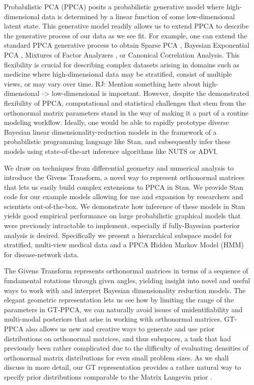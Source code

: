 \documentclass{article}
\newcommand{\commentRJ}[1]{{\textcolor{commentRJ_color}{RJ: #1}}}
\begin{document}
Probabilistic PCA (PPCA) \citep{tipping1999probabilistic} posits a probabilistic generative model where high-dimensional data is determined by a linear function of some low-dimensional latent state. This generative model readily allows us to extend PPCA to describe the generative process of our data as we see fit. For example, one can extend the standard PPCA generative process to obtain Sparse PCA \citep{hoff2009simulation}, Bayesian Exponential PCA \citep{mohamed2009bayesian}, Mixtures of Factor Analyzers \citep{ghahramani1996algorithm}, or Canonical Correlation Analysis. This flexibility is crucial for describing complex datasets arising in domains such as medicine where high-dimensional data may be stratified, consist of multiple views, or may vary over time. \commentRJ{Mention something here about high-dimensional -> low-dimensional is important.} However, despite the demonstrated flexibility of PPCA, computational and statistical challenges that stem from the orthonormal matrix parameters stand in the way of making it a part of a routine modeling workflow. Ideally, one would be able to rapidly prototype diverse Bayesian linear dimensionality-reduction models in the framework of a probabilistic programming language like Stan, and subsequently infer these models using state-of-the-art inference algorithms like NUTS or ADVI. 

We draw on techniques from differential geometry and numerical analysis to introduce the Givens Transform, a novel way to represent orthonormal matrices that lets us easily build complex extensions to PPCA in Stan. We provide Stan code for our example models allowing for use and expansion by researchers and scientists out-of-the-box. We demonstrate how inference of these models in Stan yields good empirical performance on large probabilistic graphical models that were previously intractable to implement, especially if fully-Bayesian posterior analysis is desired. Specifically we present a hierarchical subspace model for stratified, multi-view medical data and a PPCA Hidden Markov Model (HMM) for disease-network data.

The Givens Transform represents orthonormal matrices in terms of a sequence of fundamental rotations through given angles, yielding insight into novel and useful ways to work with and interpret Bayesian dimensionality reduction models.  The elegant geometric representation lets us see how by limiting the range of the parameters in GT-PPCA, we can naturally avoid issues of unidentifiability and multi-modal posteriors that arise in working with orthonormal matrices.  GT-PPCA also allows us new and creative ways to generate and use prior distributions on orthonormal matrices, and thus subspaces, a task that had previously been rather complicated due to the difficulty of evaluating densities of orthonormal matrix distributions for even small problem sizes.  As we shall discuss in more detail, our GT representation provides a rather natural way to specify prior distributions comparable to the Matrix Langevin prior \citep{muirhead2009aspects}.
\end{document}
